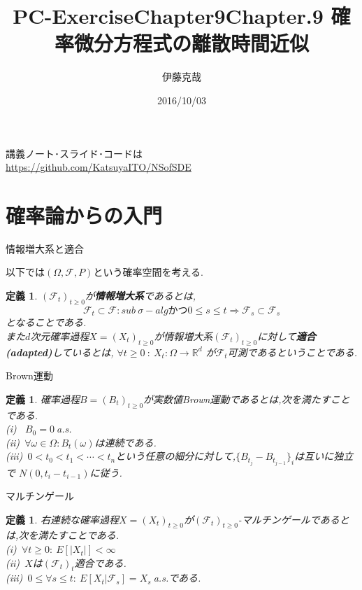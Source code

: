\documentclass[dvipdfmx,cjk]{beamer}
\title{PC-ExerciseChapter9}
\numberwithin{equation}{section}
\newtheorem{Def}     [Thm]{定義}
\def\R{\mathbb R}
\def\F{\mathcal F}
\def\defb{\begin{Def}}
\def\defx{\end{Def}}
\begin{document}
\title[Chap8]{Chapter.9 確率微分方程式の離散時間近似} 
\author[Katsuya ITO]{伊藤克哉} 
\date{2016/10/03}

\begin{frame}
\titlepage    
\end{frame}
\begin{frame}
講義ノート･スライド･コードは\\
\url{https://github.com/KatsuyaITO/NSofSDE}
\end{frame}
\begin{frame}
\tableofcontents
\end{frame}


\section{確率論からの入門}
\begin{frame}{情報増大系と適合}

以下では$(\Omega,\F,P)$という確率空間を考える.
\defb
$(\F_t)_{t\ge0}$が{\bf 情報増大系}であるとは,
\[
\F_t \subset \F : sub\ \sigma-alg \mbox{かつ} 0\le s \le t \Rightarrow \F_s \subset \F_s
\]
となることである.\\
また$d$次元確率過程$X=(X_t)_{t\ge 0}$が情報増大系$(\F_t)_{t\ge0}$に対して{\bf 適合(adapted)}しているとは,
$\forall t \ge 0 \ : \ X_t:\Omega \to \R^d$ が$\F_t$可測であるということである.
\defx

\end{frame}

\begin{frame}{Brown運動}
\defb
確率過程$B=(B_t)_{t\ge 0}$が実数値Brown運動であるとは,次を満たすことである.\\
(i) \ $B_0 = 0 \  $a.s.\\
(ii)\ $\forall \omega \in \Omega:B_t(\omega)$は連続である.\\
(iii)\ $0 < t_0 < t_1 < \cdots < t_n $という任意の細分に対して,$\{B_{t_j} - B_{t_{j-1}}\}_{i}$は互いに独立で
$N(0,t_i-t_{i-1})$に従う.
\defx
\end{frame}

\begin{frame}{マルチンゲール}
\defb
右連続な確率過程$X=(X_t)_{t\ge 0}$が$(\F_t)_{t\ge 0}$-マルチンゲールであるとは,次を満たすことである.\\
(i)\ $\forall t \ge 0:\ E[|X_t|] < \infty$\\
(ii)\ $X$は$(\F_t)_t$適合である.\\
(iii)\ $0\le \forall s \le t:\ E[X_t|\F_s] = X_s\ $a.s.である.
\defx

\end{frame}
\end{document}
